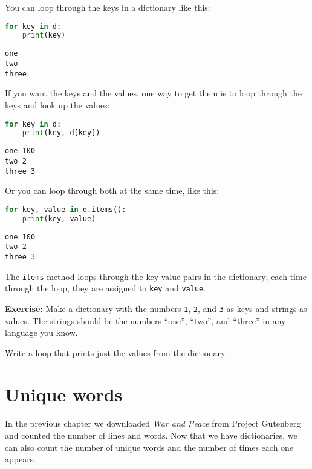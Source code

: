You can loop through the keys in a dictionary like this:

\begin{lstlisting}[language=Python,style=source]
for key in d:
    print(key)
\end{lstlisting}

\begin{lstlisting}[style=output]
one
two
three
\end{lstlisting}

If you want the keys and the values, one way to get them is to loop
through the keys and look up the values:

\begin{lstlisting}[language=Python,style=source]
for key in d:
    print(key, d[key])
\end{lstlisting}

\begin{lstlisting}[style=output]
one 100
two 2
three 3
\end{lstlisting}

Or you can loop through both at the same time, like this:

\begin{lstlisting}[language=Python,style=source]
for key, value in d.items():
    print(key, value)
\end{lstlisting}

\begin{lstlisting}[style=output]
one 100
two 2
three 3
\end{lstlisting}

The \passthrough{\lstinline!items!} method loops through the key-value
pairs in the dictionary; each time through the loop, they are assigned
to \passthrough{\lstinline!key!} and \passthrough{\lstinline!value!}.

\textbf{Exercise:} Make a dictionary with the numbers
\passthrough{\lstinline!1!}, \passthrough{\lstinline!2!}, and
\passthrough{\lstinline!3!} as keys and strings as values. The strings
should be the numbers ``one'', ``two'', and ``three'' in any language
you know.

Write a loop that prints just the values from the dictionary.

\hypertarget{unique-words}{%
\section{Unique words}\label{unique-words}}

In the previous chapter we downloaded \emph{War and Peace} from Project
Gutenberg and counted the number of lines and words. Now that we have
dictionaries, we can also count the number of unique words and the
number of times each one appears.

